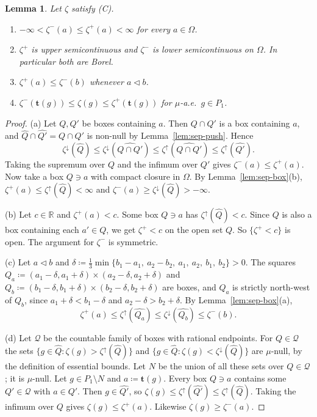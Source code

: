 \documentclass[11pt]{article}
\newtheorem{lemma}[theorem]{Lemma}
\theoremstyle{definition}\newtheorem{definition}[theorem]{Definition}
\theoremstyle{remark}\newtheorem{remark}[theorem]{Remark}
\begin{document}
\begin{lemma}\label{lem:sep-env}
Let $\zeta$ satisfy (C).
\begin{enumerate}[label=(\alph*)]
\item $-\infty<\zeta^-(a)\le\zeta^+(a)<\infty$ for every $a\in\Omega$.
\item $\zeta^+$ is upper semicontinuous and $\zeta^-$ is lower
semicontinuous on $\Omega$. In particular both are Borel.
\item $\zeta^+(a)\le\zeta^-(b)$ whenever $a\lhd b$.
\item $\zeta^-(\mathbf t(g))\le\zeta(g)\le\zeta^+(\mathbf t(g))$ for
$\mu$-a.e.\ $g\in P_1$.
\end{enumerate}
\end{lemma}

\begin{proof}
(a) Let $Q,Q'$ be boxes containing $a$. Then $Q\cap Q'$ is a box containing
$a$, and $\widehat Q\cap\widehat{Q'}=\widehat{Q\cap Q'}$ is non-null by
Lemma~\ref{lem:sep-push}. Hence
\[
 \zeta^{\downarrow}(\widehat Q)\le\zeta^{\downarrow}(\widehat{Q\cap Q'})
 \le\zeta^{\uparrow}(\widehat{Q\cap Q'})\le\zeta^{\uparrow}(\widehat{Q'}).
\]
Taking the supremum over $Q$ and the infimum over $Q'$ gives
$\zeta^-(a)\le\zeta^+(a)$. Now take a box $Q\ni a$ with compact closure in
$\Omega$. By Lemma~\ref{lem:sep-box}(b),
$\zeta^+(a)\le\zeta^{\uparrow}(\widehat Q)<\infty$ and
$\zeta^-(a)\ge\zeta^{\downarrow}(\widehat Q)>-\infty$.

(b) Let $c\in\mathbb R$ and $\zeta^+(a)<c$. Some box $Q\ni a$ has
$\zeta^{\uparrow}(\widehat Q)<c$. Since $Q$ is also a box containing each
$a'\in Q$, we get $\zeta^+<c$ on the open set $Q$. So $\{\zeta^+<c\}$ is
open. The argument for $\zeta^-$ is symmetric.

(c) Let $a\lhd b$ and
$\delta\coloneqq\frac13\min\{b_1-a_1,\ a_2-b_2,\ a_1,\ a_2,\ b_1,\ b_2\}>0$.
The squares
$Q_a\coloneqq(a_1-\delta,a_1+\delta)\times(a_2-\delta,a_2+\delta)$ and
$Q_b\coloneqq(b_1-\delta,b_1+\delta)\times(b_2-\delta,b_2+\delta)$ are boxes,
and $Q_a$ is strictly north-west of $Q_b$, since $a_1+\delta<b_1-\delta$ and
$a_2-\delta>b_2+\delta$. By Lemma~\ref{lem:sep-box}(a),
\[
 \zeta^+(a)\le\zeta^{\uparrow}(\widehat{Q_a})\le\zeta^{\downarrow}(\widehat{Q_b})\le\zeta^-(b).
\]

(d) Let $\mathcal Q$ be the countable family of boxes with rational
endpoints. For $Q\in\mathcal Q$ the sets
$\{g\in\widehat Q:\zeta(g)>\zeta^{\uparrow}(\widehat Q)\}$ and
$\{g\in\widehat Q:\zeta(g)<\zeta^{\downarrow}(\widehat Q)\}$ are $\mu$-null,
by the definition of essential bounds. Let $N$ be the union of all these
sets over $Q\in\mathcal Q$; it is $\mu$-null. Let $g\in P_1\setminus N$ and
$a\coloneqq\mathbf t(g)$. Every box $Q\ni a$ contains some $Q'\in\mathcal Q$
with $a\in Q'$. Then $g\in\widehat{Q'}$, so
$\zeta(g)\le\zeta^{\uparrow}(\widehat{Q'})\le\zeta^{\uparrow}(\widehat Q)$.
Taking the infimum over $Q$ gives $\zeta(g)\le\zeta^+(a)$. Likewise
$\zeta(g)\ge\zeta^-(a)$.
\end{proof}
\end{document}
